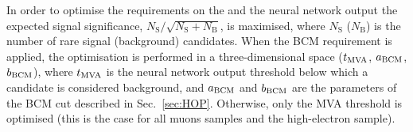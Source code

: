 In order to optimise the requirements on the \mbcm and the neural network output the expected
signal significance, $N_{\mathrm{S}}/\sqrt{N_{\mathrm{S}}+N_{\mathrm{B}}}$, is maximised,
where $N_\mathrm{S}$ ($N_\mathrm{B}$) is the number of rare signal (background) candidates.
When the BCM requirement is applied, the optimisation is performed in a three-dimensional space
($t_{\rm MVA}$, $a_{\rm BCM}$, $b_{\rm BCM}$), where $t_{\rm MVA}$ is the neural network output threshold below which
a candidate is considered background, and $a_{\rm BCM}$ and $b_{\rm BCM}$ are the parameters of the BCM
cut described in Sec.~\ref{sec:HOP}. Otherwise, only the MVA threshold is optimised 
(this is the case for all muons samples and the high-\qsq electron sample).


